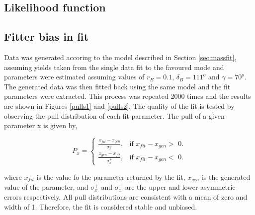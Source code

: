 \subsection{Likelihood function}
\label{sec:cpfit:likelihood}

\subsection{Fitter bias in \CP fit}
\label{sec:cpfit:fitterbias}

Data was generated accoring to the model described in Section \ref{sec:massfit}, assuming yields taken from the single data fit to the favoured mode and \CP parameters were estimated assuming values of $r_B = 0.1$, $\delta_B = 111^o$ and $\gamma = 70^o$. The generated data was then fitted back using the same model and the fit parameters were extracted. This process was repeated 2000 times and the results are shown in Figures \ref{pulls1} and \ref{pulls2}. The quality of the fit is tested by observing the pull distribution of each fit parameter. The pull of a given parameter x is given by,

\begin{equation*}
P_x = \begin{cases}
	\frac{x_{fit} - x_{gen}}{\sigma_x^-}, & \text{if $x_{fit} - x_{gen} >$ 0}. \\
	\frac{x_{gen} - x_{fit}}{\sigma_x^+}, & \text{if $x_{fit} - x_{gen} <$ 0}.
	\end{cases}
\end{equation*}

where $x_{fit}$ is the value fo the parameter returned by the fit, $x_{gen}$ is the generated value of the parameter, and $\sigma_x^+$ and $\sigma_x^-$ are the upper and lower asymmetric errors respectively. All pull distributions are consistent with a mean of zero and width of 1. Therefore, the fit is considered stable and unbiased.
 
